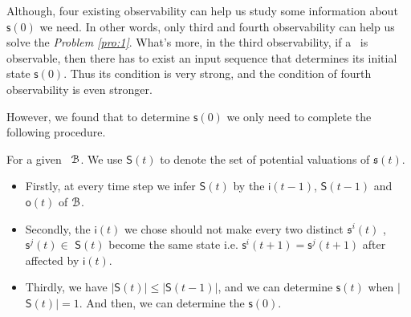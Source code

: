 Although, four existing observability can help us study some information about $\mathsf{s}(0)$ we need. %
In other words, only third and fourth observability can help us solve the {\em Problem \ref{pro:1}}. What's more, in the third observability, if a \BCN\ is observable, then there has to exist an input sequence that determines its initial state $\mathsf{s}(0)$. Thus its condition is very strong, and the condition of fourth observability is even stronger. 


However, we found that to determine $\mathsf{s}(0)$ we only need to complete the following procedure.

For a given \BCN\  ${\mathcal{B}}$.  We use $\mathsf{S}(t)$ to denote the set of potential valuations of $\mathfrak{s}(t)$. 
\begin{itemize}
	\item  Firstly, at every time step we infer $\mathsf{S}(t)$ by the $\mathsf{i}(t-1)$, $\mathsf{S}(t-1)$ and $\mathsf{o}(t)$ of ${\mathcal{B}}$.
	\item Secondly, the $\mathsf{i}(t)$ we chose should not make every two distinct $\mathfrak{s}^{i}(t)$ , $\mathsf{s}^{j}(t)$$\in$ $\mathsf{S}(t)$ become the same state i.e. $\mathsf{s}^{i}(t+1)=$$\mathsf{s}^{j}(t+1)$ after affected by $\mathsf{i}(t)$.  
	\item Thirdly, we have $|$$\mathsf{S}(t)$$|\le|$$\mathsf{S}(t-1)$$|$, and we can determine $\mathsf{s}(t)$ when $|$$\mathsf{S}(t)$$|=1$. And then, we can determine the $\mathsf{s}(0)$.
\end{itemize}

